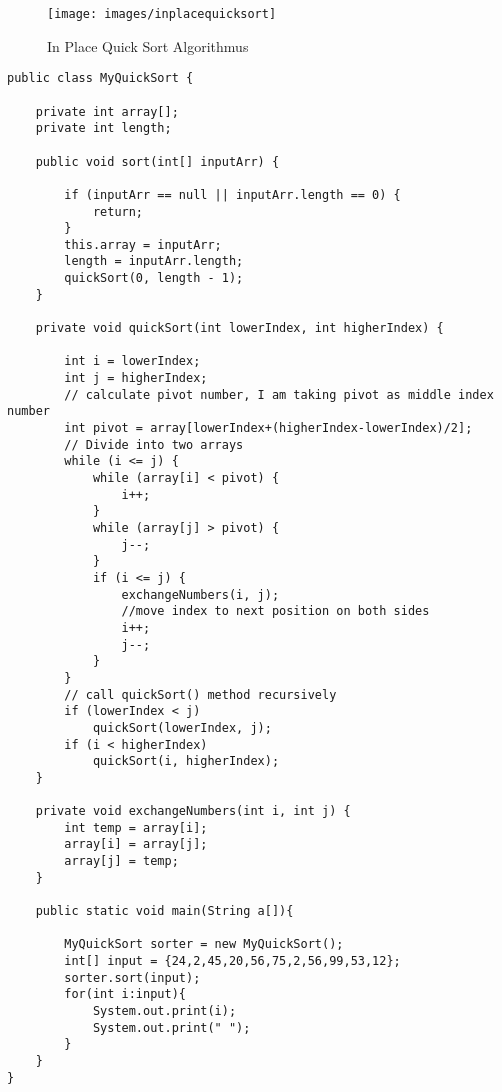 \begin{figure}[h!]
	\centering
	\begin{minipage}[t]{0.6\textwidth}
		\centering
		\texttt{[image: images/inplacequicksort]}
		\caption{In Place Quick Sort Algorithmus}
		\label{fig:quicksortalg}
	\end{minipage}
\end{figure}

\newpage

\begin{lstlisting}[caption=Quick Sort ohne Comparator]
public class MyQuickSort {
     
    private int array[];
    private int length;
 
    public void sort(int[] inputArr) {
         
        if (inputArr == null || inputArr.length == 0) {
            return;
        }
        this.array = inputArr;
        length = inputArr.length;
        quickSort(0, length - 1);
    }
 
    private void quickSort(int lowerIndex, int higherIndex) {
         
        int i = lowerIndex;
        int j = higherIndex;
        // calculate pivot number, I am taking pivot as middle index number
        int pivot = array[lowerIndex+(higherIndex-lowerIndex)/2];
        // Divide into two arrays
        while (i <= j) {
            while (array[i] < pivot) {
                i++;
            }
            while (array[j] > pivot) {
                j--;
            }
            if (i <= j) {
                exchangeNumbers(i, j);
                //move index to next position on both sides
                i++;
                j--;
            }
        }
        // call quickSort() method recursively
        if (lowerIndex < j)
            quickSort(lowerIndex, j);
        if (i < higherIndex)
            quickSort(i, higherIndex);
    }
 
    private void exchangeNumbers(int i, int j) {
        int temp = array[i];
        array[i] = array[j];
        array[j] = temp;
    }
     
    public static void main(String a[]){
         
        MyQuickSort sorter = new MyQuickSort();
        int[] input = {24,2,45,20,56,75,2,56,99,53,12};
        sorter.sort(input);
        for(int i:input){
            System.out.print(i);
            System.out.print(" ");
        }
    }
}
\end{lstlisting}
\clearpage

